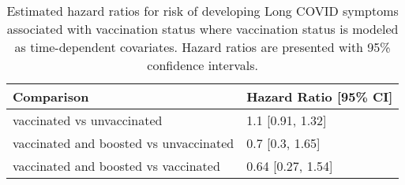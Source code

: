 \begin{table}[!htbp]
\centering
\begin{tabular}{ll}
  \hline
Comparison & Hazard Ratio [95\% CI] \\ 
  \hline
vaccinated vs unvaccinated & 1.1 [0.91, 1.32] \\ 
  vaccinated and boosted vs unvaccinated & 0.7 [0.3, 1.65] \\ 
  vaccinated and boosted vs vaccinated & 0.64 [0.27, 1.54] \\ 
   \hline
\end{tabular}
\caption{Estimated hazard ratios for risk of developing Long COVID symptoms associated with vaccination status where vaccination status is modeled as time-dependent covariates. Hazard ratios are presented with 95\% confidence intervals.} 
\label{tab:cox_time_dep_after_emm_pairs}
\end{table}
